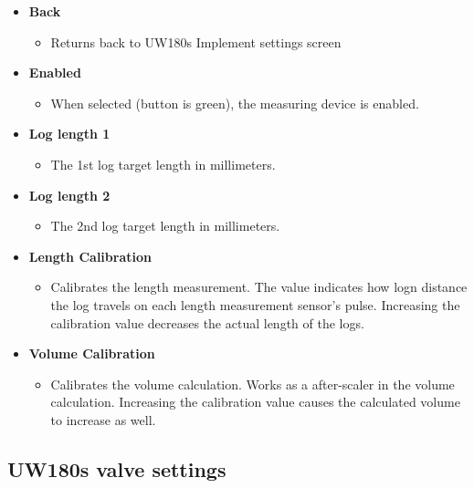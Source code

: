 \documentclass[12pt,a4paper,english]{uvmanual}
\begin{document}
\begin{itemize}
 \item \textbf{Back}
 \begin{itemize}
  \item Returns back to UW180s Implement settings screen
 \end{itemize}

 \item \textbf{Enabled}
 \begin{itemize}
  \item When selected (button is green), the measuring device is enabled.
 \end{itemize}

 \item \textbf{Log length 1}
 \begin{itemize}
  \item The 1st log target length in millimeters.
 \end{itemize}

 \item \textbf{Log length 2}
 \begin{itemize}
  \item The 2nd log target length in millimeters.
 \end{itemize}

 \item \textbf{Length Calibration}
 \begin{itemize}
  \item Calibrates the length measurement. The value indicates how logn distance the log travels on each length measurement sensor's pulse. Increasing the calibration value decreases the actual length of the logs.
 \end{itemize}

 \item \textbf{Volume Calibration}
 \begin{itemize}
  \item Calibrates the volume calculation. Works as a after-scaler in the volume calculation. Increasing the calibration value causes the calculated volume to increase as well.
 \end{itemize}

\end{itemize}


\FloatBarrier
\subsection{UW180s valve settings}\label{ch:settings_uw180s_valves}
\end{document}
